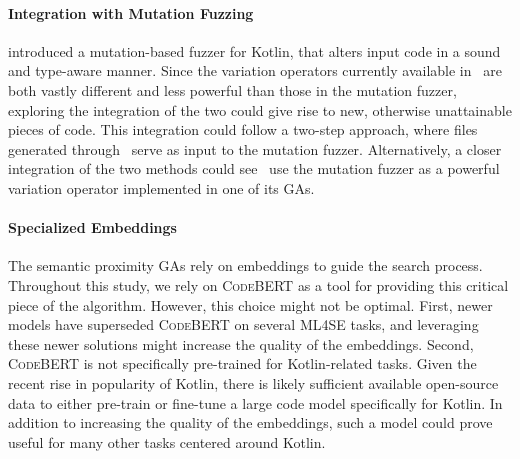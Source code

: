 \paragraph{Integration with Mutation Fuzzing} \citet{stepanov2021type} introduced
a mutation-based fuzzer for Kotlin, that alters input code
in a sound and type-aware manner.
Since the variation operators currently available in \kf~are both vastly
different and less powerful than those in the mutation fuzzer,
exploring the integration of the two could give rise to new,
otherwise unattainable pieces of code.
This integration could follow a two-step approach,
where files generated through \kf~serve as input to the mutation fuzzer.
Alternatively, a closer integration of the two methods
could see \kf~use the mutation fuzzer as a powerful variation operator
implemented in one of its \gls{GA}s.

\paragraph{Specialized Embeddings}
The semantic proximity \gls{GA}s rely on embeddings to
guide the search process.
Throughout this study, we rely on \textsc{CodeBERT} \citet{feng2020codebert} as a
tool for providing this critical piece of the algorithm.
However, this choice might not be optimal.
First, newer models have superseded \textsc{CodeBERT} on several
\gls{ML4SE} tasks, and leveraging these newer solutions might increase
the quality of the embeddings.
Second, \textsc{CodeBERT} is not specifically pre-trained for Kotlin-related tasks.
Given the recent rise in popularity of Kotlin, there is likely
sufficient available open-source data to either pre-train
or fine-tune a large code model specifically for Kotlin.
In addition to increasing the quality of the embeddings,
such a model could prove useful for many other tasks
centered around Kotlin.
